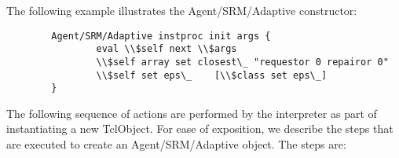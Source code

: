 The following example illustrates the Agent/SRM/Adaptive constructor:
\begin{verbatim}
        Agent/SRM/Adaptive instproc init args {
                eval \\$self next \\$args
                \\$self array set closest\_ "requestor 0 repairor 0"
                \\$self set eps\_    [\\$class set eps\_]
        }
\end{verbatim}

The following sequence of actions are performed by the interpreter
as part of instantiating a new TclObject.
For ease of exposition, we describe the steps that are executed
to create an Agent/SRM/Adaptive object.
The steps are:
